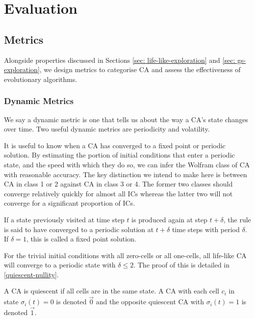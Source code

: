 \chapter{Evaluation} \label{evaluation}

\section{Metrics}
Alongside properties discussed in Sections \ref{sec: life-like-exploration} and \ref{sec: gs-exploration}, we design metrics to categorise CA and assess the effectiveness of evolutionary algorithms.

\subsection{Dynamic Metrics}
We say a dynamic metric is one that tells us about the way a CA's state changes over time. Two useful dynamic metrics are periodicity and volatility.

It is useful to know when a CA has converged to a fixed point or periodic solution. By estimating the portion of initial conditions that enter a periodic state, and the speed with which they do so, we can infer the Wolfram class of CA with reasonable accuracy. The key distinction we intend to make here is between CA in class 1 or 2 against CA in class 3 or 4. The former two classes should converge relatively quickly for almost all ICs whereas the latter two will not converge for a significant proportion of ICs.

\begin{definition}
 If a state previously visited at time step $t$ is produced again at step $t+\delta$, the rule is said to have converged to a periodic solution at $t+\delta$ time steps with period $\delta$. If $\delta = 1$, this is called a fixed point solution. 
\end{definition}

For the trivial initial conditions with all zero-cells or all one-cells, all life-like CA will converge to a periodic state with $\delta \leq 2$. The proof of this is detailed in \ref{quiescent-nullity}.

\begin{definition}[Quiescence]
A CA is quiescent if all cells are in the same state. A CA with each cell $c_i$ in state $\sigma_i(t) = 0$ is denoted $\vec{0}$ and the opposite quiescent CA with $\sigma_i(t) = 1$ is denoted $\vec{1}$. 
\end{definition}

